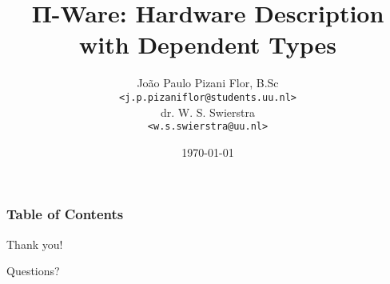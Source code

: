 \documentclass{beamer}
\title[PiWare]{Π-Ware: Hardware Description with Dependent Types}
\date{\today}
\author[J. P. Pizani Flor]{
    João Paulo Pizani Flor, B.Sc \\
    \small{\texttt{<j.p.pizaniflor@students.uu.nl>}} \\
    \medskip
    dr. W. S. Swierstra \\
    \small{\texttt{<w.s.swierstra@uu.nl>}}
}
\institute[Utrecht University] {
    Department of Information and Computing Sciences \\
    Utrecht University
}
\begin{document}
    \begin{frame}
        \titlepage
    \end{frame}

    \begin{frame}
        \frametitle{Table of Contents}
        \tableofcontents
    \end{frame}


    
    
    


    \begin{frame}[plain]
        \begin{center}
            \par{\Huge{Thank you!}}
            \vspace{2.0cm}
            \par{\Huge{Questions?}}
        \end{center}
    \end{frame}
\end{document}
